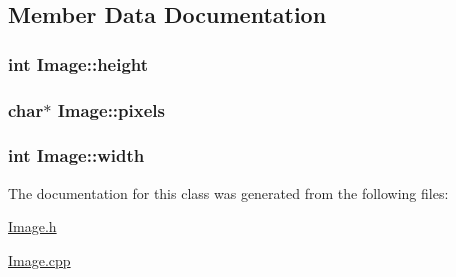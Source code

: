 \subsection{Member Data Documentation}
\hypertarget{classImage_a51df43db420c9c0b57536cb2dd36de5c}{
\subsubsection[{height}]{\setlength{\rightskip}{0pt plus 5cm}int Image\-::height}}\label{classImage_a51df43db420c9c0b57536cb2dd36de5c}
\hypertarget{classImage_a6afbcf4b0a2774f020ce350bff9d0d6c}{
\subsubsection[{pixels}]{\setlength{\rightskip}{0pt plus 5cm}char$\ast$ Image\-::pixels}}\label{classImage_a6afbcf4b0a2774f020ce350bff9d0d6c}
\hypertarget{classImage_ab8d12f635013c04159cd4d3d972bac88}{
\subsubsection[{width}]{\setlength{\rightskip}{0pt plus 5cm}int Image\-::width}}\label{classImage_ab8d12f635013c04159cd4d3d972bac88}


The documentation for this class was generated from the following files\-:\begin{DoxyCompactItemize}
\item 
\hyperlink{Image_8h}{Image.\-h}\item 
\hyperlink{Image_8cpp}{Image.\-cpp}\end{DoxyCompactItemize}
